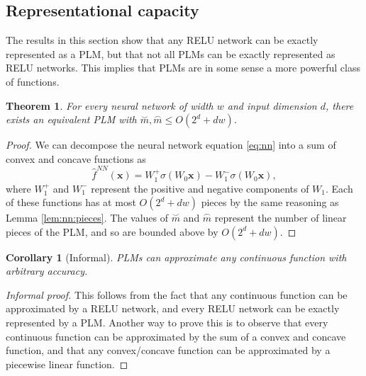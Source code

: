 \documentclass{article}
\newtheorem{corollary}{Corollary}
\newtheorem{theorem}{Theorem}
\newcommand{\wnn}{W}
\newcommand{\x}{\mathbf{x}}
\newcommand{\f}{f}
\newcommand{\fhat}{{\hat\f}}
\newcommand{\fnn}{{\fhat^\textit{NN}}}
\newcommand{\mconvex}{{\stackrel\smile m}}
\newcommand{\mconcave}{{\stackrel\frown m}}
\newcommand{\posp}[1]{{#1}^+}
\newcommand{\negp}[1]{{#1}^-}
\begin{document}

\subsection{Representational capacity}

The results in this section show that any RELU network can be exactly represented as a PLM,
but that not all PLMs can be exactly represented as RELU networks.
This implies that PLMs are in some sense a more powerful class of functions.


\begin{theorem}
For every neural network of width $w$ and input dimension $d$, 
there exists an equivalent PLM with $\mconvex,\mconcave \le O(2^d+dw)$.
\label{thm:plm:nn}
\end{theorem}
\begin{proof}
We can decompose the neural network equation \eqref{eq:nn} into a sum of convex and concave functions as
\begin{equation}
    \fnn(\x) = \posp\wnn_1\sigma(\wnn_0\x) - \negp\wnn_1\sigma(\wnn_0\x),
\end{equation}
where $\posp\wnn_1$ and $\negp\wnn_1$ represent the positive and negative components of $\wnn_1$.
Each of these functions has at most $O(2^d+dw)$ pieces by the same reasoning as Lemma \ref{lem:nn:pieces}.
The values of $\mconvex$ and $\mconcave$ represent the number of linear pieces of the PLM,
and so are bounded above by $O(2^d+dw)$.
\end{proof}


\begin{corollary}[Informal]
PLMs can approximate any continuous function with arbitrary accuracy.
\end{corollary}
\begin{proof}[Informal proof]
This follows from the fact that any continuous function can be approximated by a RELU network,
and every RELU network can be exactly represented by a PLM.
Another way to prove this is to observe that every continuous function can be approximated by the sum of a convex and concave function,
and that any convex/concave function can be approximated by a piecewise linear function.
\end{proof}

\end{document}
